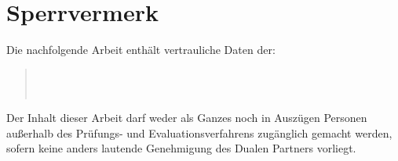 \chapter*{Sperrvermerk}
Die nachfolgende Arbeit enthält vertrauliche Daten der:
\begin{quote}
	\firmaName \\
	\firmaStrasse \\
	\firmaPlz
\end{quote}

\vspace{0.5cm}

Der Inhalt dieser Arbeit darf weder als Ganzes noch in Auszügen Personen außerhalb des Prüfungs- und Evaluationsverfahrens zugänglich gemacht werden, sofern keine anders lautende Genehmigung des Dualen Partners vorliegt.